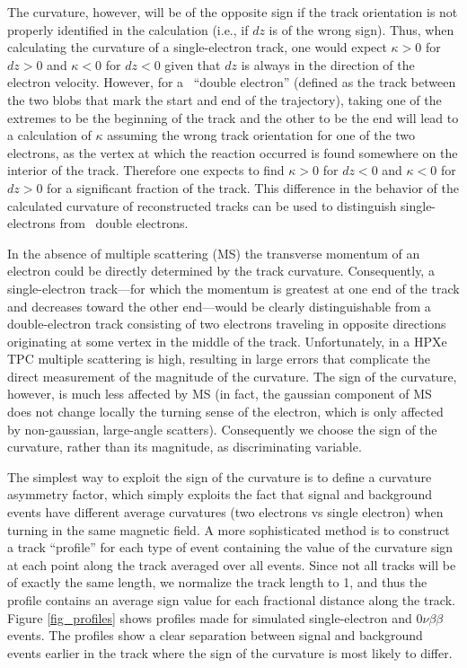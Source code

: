 The curvature, however, will be of the opposite sign if the track orientation is not properly identified in the calculation (i.e., if $dz$ is of the wrong sign).  Thus, when calculating the curvature of a single-electron track, one would expect $\kappa > 0$ for $dz > 0$ and $\kappa < 0$ for $dz < 0$ given that $dz$ is always in the direction of the electron velocity.  However, for a \bbonu\ ``double electron'' (defined as the track between the two blobs that mark the start and end of the trajectory), taking one of the extremes to be the beginning of the track and the other to be the end will lead to a calculation of $\kappa$ assuming the wrong track orientation for one of the two electrons, as the vertex at which the reaction occurred is found somewhere on the interior of the track.  Therefore one expects to find $\kappa > 0$ for $dz < 0$ and $\kappa < 0$ for $dz > 0$ for a significant fraction of the track.  This difference in the behavior of the calculated curvature of reconstructed tracks can be used to distinguish single-electrons from \bbonu\ double electrons.

In the absence of multiple scattering (MS) the transverse momentum of an electron could be directly determined by the track
curvature. Consequently, a single-electron track---for which the momentum is greatest at one end of the track and decreases toward the other end---would be clearly distinguishable
from a double-electron track consisting of two electrons traveling in opposite directions originating at some vertex in the middle of the track.  Unfortunately, in a HPXe TPC multiple scattering is high, resulting in large errors that complicate the direct measurement of the magnitude of the curvature. The sign of the curvature, however, is much less affected by MS (in fact, the gaussian component of MS does not change locally the turning sense of the electron, which is only affected by non-gaussian, large-angle scatters). Consequently we choose the sign of the curvature, rather than its magnitude, as discriminating variable.  

The simplest way to exploit the sign of the curvature is to define a 
curvature asymmetry factor, which simply exploits the fact that signal and background events have different average curvatures (two electrons vs single electron) when turning in the same magnetic field.  A more sophisticated method is to construct a track ``profile'' for each type of event containing the value of the curvature sign at each point along the track averaged over all events.  Since not all tracks will be of exactly the same length, we normalize the track length to 1, and thus the profile contains an average sign value for each fractional distance along the track.  Figure \ref{fig_profiles} shows profiles made for simulated single-electron and $0\nu\beta\beta$ events.  The profiles show a clear separation between signal and background events earlier in the track where the sign of the curvature is most likely to differ.

